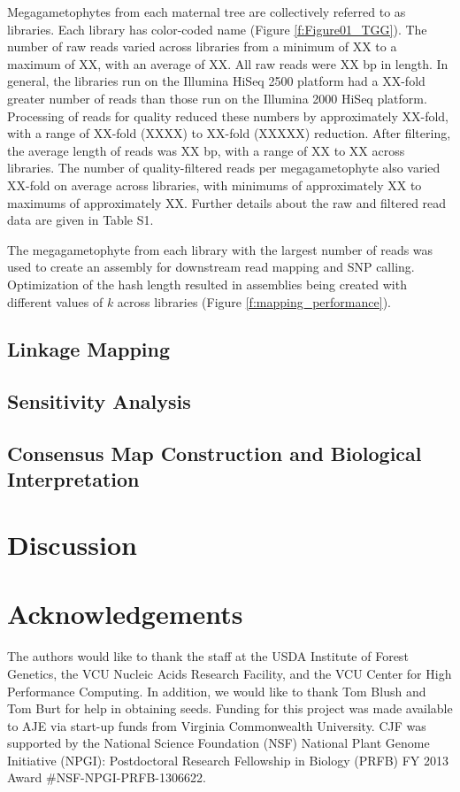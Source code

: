 \documentclass[11pt]{article}
\begin{document}
Megagametophytes from each maternal tree are 
collectively referred to as libraries. Each library has color-coded name (Figure \ref{f:Figure01_TGG}).
The number of raw reads varied across libraries from a minimum of
XX to a maximum of XX, with an average of XX. All raw reads were XX bp in length. In 
general, the libraries run on the Illumina HiSeq 2500 platform had a XX-fold greater 
number of reads than those run on the 
Illumina 2000 HiSeq platform. Processing of reads for quality reduced these numbers by 
approximately XX-fold, with a range 
of XX-fold (XXXX) to XX-fold (XXXXX) reduction. After filtering, the average
length of reads was XX bp, with a range of XX to XX across libraries. The number of quality-filtered reads per megagametophyte also varied XX-fold on average 
across libraries, with minimums of approximately XX to maximums of approximately XX. Further details about the raw and filtered read data are given in Table S1.

The megagametophyte from each library with the largest number of reads
was used to create an assembly for downstream read mapping and SNP calling.
Optimization of the hash length resulted in assemblies being created with different values of 
$k$ across libraries (Figure \ref{f:mapping_performance}).


\subsection*{Linkage Mapping}

\subsection*{Sensitivity Analysis}

\subsection*{Consensus Map Construction and Biological Interpretation}


\section*{Discussion}

\section*{Acknowledgements}

The authors would like to thank the staff at the USDA Institute of Forest Genetics, the 
VCU Nucleic Acids Research Facility, and the VCU Center for High Performance Computing. 
In addition, we would like to thank Tom Blush and Tom Burt for help in obtaining 
seeds. Funding for this project was made available to AJE via start-up funds from Virginia 
Commonwealth University. CJF was supported by the National Science Foundation (NSF) National Plant Genome 
Initiative (NPGI): Postdoctoral Research Fellowship in Biology (PRFB) FY 2013 Award \#NSF-NPGI-PRFB-1306622.
\end{document}
